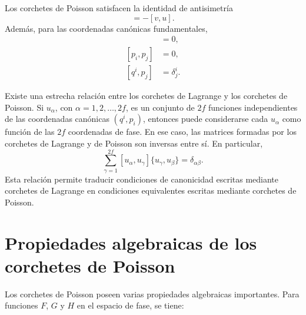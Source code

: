 \documentclass[../apunte_mecanica_clasica.tex]{subfiles}
\begin{document}
Los corchetes de Poisson satisfacen la identidad de antisimetría
\begin{equation}
    [u,v]=-[v,u].
    \label{eq:antisimetra-poisson}
\end{equation}
Además, para las coordenadas canónicas fundamentales,
\begin{align}
    [q^i,q^j]&=0,
    \label{eq:poisson-qq} \\
    [p_i,p_j]&=0,
    \label{eq:poisson-pp} \\
    [q^i,p_j]&=\delta^i_j.
    \label{eq:poisson-qp}
\end{align}

Existe una estrecha relación entre los corchetes de Lagrange y los corchetes de Poisson. Si $u_\alpha$, con $\alpha=1,2,\ldots,2f$, es un conjunto de $2f$ funciones independientes de las coordenadas canónicas $(q^i,p_i)$, entonces puede considerarse cada $u_\alpha$ como función de las $2f$ coordenadas de fase. En ese caso, las matrices formadas por los corchetes de Lagrange y de Poisson son inversas entre sí. En particular,
\begin{equation}
    \sum_{\gamma=1}^{2f}
    [u_\alpha,u_\gamma]\{u_\gamma,u_\beta\}
    =
    \delta_{\alpha\beta}.
    \label{eq:relacion-lagrange-poisson}
\end{equation}
Esta relación permite traducir condiciones de canonicidad escritas mediante corchetes de Lagrange en condiciones equivalentes escritas mediante corchetes de Poisson.

\section{Propiedades algebraicas de los corchetes de Poisson}

Los corchetes de Poisson poseen varias propiedades algebraicas importantes. Para funciones $F$, $G$ y $H$ en el espacio de fase, se tiene:
\end{document}
